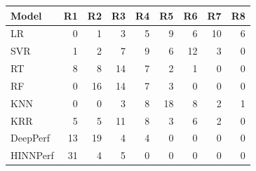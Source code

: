 \begin{tabular}{lrrrrrrrr}
\toprule
Model & R1 & R2 & R3 & R4 & R5 & R6 & R7 & R8 \\
\midrule
LR & 0 & 1 & 3 & 5 & 9 & 6 & 10 & 6 \\
SVR & 1 & 2 & 7 & 9 & 6 & 12 & 3 & 0 \\
RT & 8 & 8 & 14 & 7 & 2 & 1 & 0 & 0 \\
RF & 0 & 16 & 14 & 7 & 3 & 0 & 0 & 0 \\
KNN & 0 & 0 & 3 & 8 & 18 & 8 & 2 & 1 \\
KRR & 5 & 5 & 11 & 8 & 3 & 6 & 2 & 0 \\
DeepPerf & 13 & 19 & 4 & 4 & 0 & 0 & 0 & 0 \\
HINNPerf & 31 & 4 & 5 & 0 & 0 & 0 & 0 & 0 \\
\bottomrule
\end{tabular}
